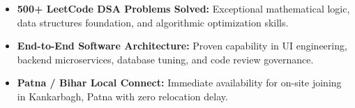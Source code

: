 \documentclass[a4paper,10pt]{article}
\begin{document}
\begin{itemize}

    \item \textbf{500+ LeetCode DSA Problems Solved:} Exceptional mathematical logic, data structures foundation, and algorithmic optimization skills.

    \item \textbf{End-to-End Software Architecture:} Proven capability in UI engineering, backend microservices, database tuning, and code review governance.

    \item \textbf{Patna / Bihar Local Connect:} Immediate availability for on-site joining in Kankarbagh, Patna with zero relocation delay.

\end{itemize}

\end{document}
